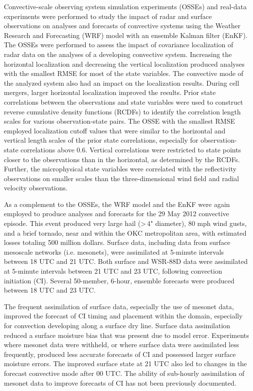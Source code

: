 \begin{preface}

\tableofcontents
\listoftables
\listoffigures
{}
Convective-scale observing system simulation experiments (OSSEs) and real-data experiments were performed to study the impact of radar and surface observations on analyses and forecasts of convective systems using the Weather Research and Forecasting (WRF) model with an ensemble Kalman filter (EnKF). The OSSEs were performed to assess the impact of covariance localization of radar data on the analyses of a developing convective system. Increasing the horizontal localization and decreasing the vertical localization produced analyses with the smallest RMSE for most of the state variables. The convective mode of the analyzed system also had an impact on the localization results. During cell mergers, larger horizontal localization improved the results. Prior state correlations between the observations and state variables were used to construct reverse cumulative density functions (RCDFs) to identify the correlation length scales for various observation-state pairs. The OSSE with the smallest RMSE employed localization cutoff values that were similar to the horizontal and vertical length scales of the prior state correlations, especially for observation-state correlations above 0.6. Vertical correlations were restricted to state points closer to the observations than in the horizontal, as determined by the RCDFs. Further, the microphysical state variables were correlated with the reflectivity observations on smaller scales than the three-dimensional wind field and radial velocity observations.

As a complement to the OSSEs, the WRF model and the EnKF were again employed to produce analyses and forecasts for the 29 May 2012 convective episode. This event produced very large hail (\textgreater\,4" diameter), 80 mph wind gusts, and a brief tornado, near and within the OKC metropolitan area, with estimated losses totaling 500 million dollars. Surface data, including data from surface mesoscale networks (i.e. mesonets), were assimilated at 5-minute intervals between 18 UTC and 21 UTC. Both surface and WSR-88D data were assimilated at 5-minute intervals between 21 UTC and 23 UTC, following convection initiation (CI). Several 50-member, 6-hour, ensemble forecasts were produced between 18 UTC and 23 UTC.

The frequent assimilation of surface data, especially the use of mesonet data, improved the forecast of CI timing and placement within the domain, especially for convection developing along a surface dry line. Surface data assimilation reduced a surface moisture bias that was present due to model error. Experiments where mesonet data were withheld, or where surface data were assimilated less frequently, produced less accurate forecasts of CI and possessed larger surface moisture errors. The improved surface state at 21 UTC also led to changes in the forecast convective mode after 00 UTC. The ability of sub-hourly assimilation of mesonet data to improve forecasts of CI has not been previously documented.


\end{preface}
